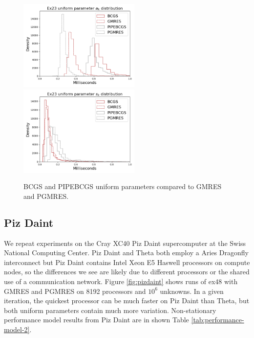\documentclass[num-refs]{wiley-article}
\begin{document}
\begin{figure}[t]
\centering
\includegraphics[width=6cm]{../plots/BCGS_GMRES_PIPEBCGS_PGMRES_ex23_8192_1000000_uniform_a_k.png} 
\includegraphics[width=6cm]{../plots/BCGS_GMRES_PIPEBCGS_PGMRES_ex23_8192_1000000_uniform_s_k.png}
\caption{BCGS and PIPEBCGS uniform parameters compared to GMRES and PGMRES.} \label{fig:bcgs}
\end{figure}

\subsection{Piz Daint}\label{sec:pizdaint}

We repeat experiments on the Cray XC40 Piz Daint supercomputer at the Swiss National Computing Center. 
Piz Daint and Theta both employ a Aries Dragonfly interconnect but Piz Daint contains Intel Xeon E5 Haswell  processors \cite{hammarlund2014haswell} on compute nodes, so the differences we see are likely due to different processors or the shared use of a communication network.
Figure \ref{fig:pizdaint} shows runs of ex48 with GMRES and PGMRES on 8192 processors and $10^6$ unknowns. 
In a given iteration, the quickest processor can be much faster on Piz Daint than Theta, but both uniform parameters contain much more variation.
Non-stationary performance model results from Piz Daint are in shown Table \ref{tab:performance-model-2}.
\end{document}
